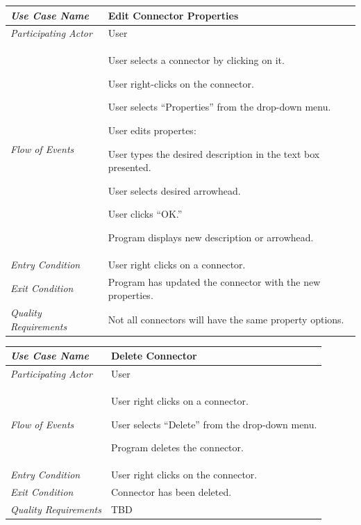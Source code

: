 \documentclass[twoside,letterpaper]{article}
\newenvironment{my_enumerate}{
\begin{enumerate}
  \setlength{\itemsep}{1pt}
  \setlength{\parskip}{0pt}
  \setlength{\parsep}{0pt}}{\end{enumerate}
}
\begin{document}
\begin{flushleft}
\tablehead{}
\begin{tabular}{|m{2.0in} m{5.0in}|}
\hline {\bfseries\emph{Use Case Name}}
& {\bfseries Edit Connector Properties}
\\\hline
\emph{Participating Actor}
& User
\\\hline
\emph{Flow of Events}
& \begin{my_enumerate}
\item User selects a connector by clicking on it.
\item User right-clicks on the connector.
\item User selects ``Properties'' from the drop-down menu.
\item User edits propertes: 
	\begin{my_enumerate}
\item User types the desired description in the text box presented.
\item User selects desired arrowhead.
\end{my_enumerate}
\item User clicks ``OK.''
\item Program displays new description or arrowhead.
\end{my_enumerate}
\\\hline
\emph{Entry Condition}
& User right clicks on a connector.
\\\hline
\emph{Exit Condition}
& Program has updated the connector with the new properties.
\\\hline
\emph{Quality Requirements}
& Not all connectors will have the same property options.
\\\hline
\end{tabular}
\end{flushleft}
\bigskip


\begin{flushleft}
\tablehead{}
\begin{tabular}{|m{2.0in} m{5.0in}|}
\hline {\bfseries\emph{Use Case Name}}
& {\bfseries Delete Connector}
\\\hline
\emph{Participating Actor}
& User
\\\hline
\emph{Flow of Events}
& \begin{my_enumerate}
\item User right clicks on a connector.
\item User selects ``Delete'' from the drop-down menu.
\item Program deletes the connector.
\end{my_enumerate}
\\\hline
\emph{Entry Condition}
& User right clicks on the connector.
\\\hline
\emph{Exit Condition}
& Connector has been deleted.
\\\hline
\emph{Quality Requirements}
& TBD
\\\hline
\end{tabular}
\end{flushleft}
\bigskip
\end{document}
